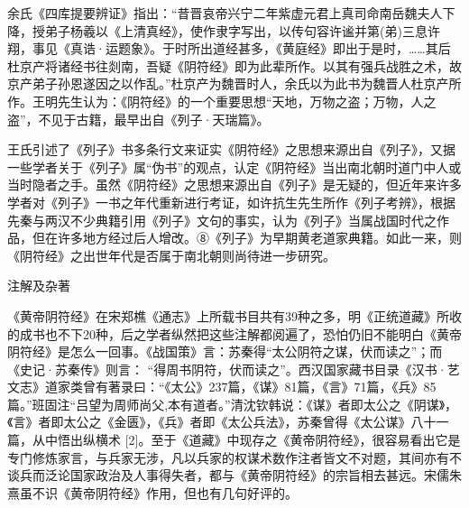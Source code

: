 \documentclass[12pt,UTF8]{ctexbook}
\begin{document}
余氏《四库提要辨证》指出：“昔晋哀帝兴宁二年紫虚元君上真司命南岳魏夫人下降，授弟子杨羲以《上清真经》，使作隶字写出，以传句容许谧并第(弟)三息许翔，事见《真诰·运题象》。于时所出道经甚多，《黄庭经》即出于是时，……其后杜京产将诸经书往剡南，吾疑《阴符经》即为此辈所作。以其有强兵战胜之术，故京产弟子孙恩遂因之以作乱。”杜京产为魏晋时人，余氏以为此书为魏晋人杜京产所作。王明先生认为：《阴符经》的一个重要思想“天地，万物之盗；万物，人之盗”，不见于古籍，最早出自《列子·天瑞篇》。

王氏引述了《列子》书多条行文来证实《阴符经》之思想来源出自《列子》，又据一些学者关于《列子》属“伪书”的观点，认定《阴符经》当出南北朝时道门中人或当时隐者之手。虽然《阴符经》之思想来源出自《列子》是无疑的，但近年来许多学者对《列子》一书之年代重新进行考证，如许抗生先生所作《列子考辨》，根据先秦与两汉不少典籍引用《列子》文句的事实，认为《列子》当属战国时代之作品，但在许多地方经过后人增改。⑧《列子》为早期黄老道家典籍。如此一来，则《阴符经》之出世年代是否属于南北朝则尚待进一步研究。

注解及杂著

《黄帝阴符经》在宋郑樵《通志》上所载书目共有39种之多，明《正统道藏》所收的成书也不下20种，后之学者纵然把这些注解都阅遍了，恐怕仍旧不能明白《黄帝阴符经》是怎么一回事。《战国策》言：苏秦得“太公阴符之谋，伏而读之”；而《史记·苏秦传》则言： “得周书阴符，伏而读之”。西汉国家藏书目录《汉书·艺文志》道家类曾有著录曰：“《太公》237篇，《谋》81篇，《言》71篇，《兵》85篇。”班固注“吕望为周师尚父,本有道者。”清沈钦韩说：《谋》者即太公之《阴谋》，《言》者即太公之《金匮》，《兵》者即《太公兵法》，苏秦曾得《太公谋》八十一篇，从中悟出纵横术 [2]。至于《道藏》中现存之《黄帝阴符经》，很容易看出它是专门修炼家言，与兵家无涉，凡以兵家的权谋术数作注者皆文不对题，其间亦有不谈兵而泛论国家政治及人事得失者，都与《黄帝阴符经》的宗旨相去甚远。宋儒朱熹虽不识《黄帝阴符经》作用，但也有几句好评的。
\end{document}
